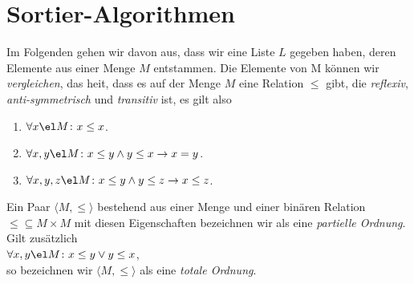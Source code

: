 \chapter{Sortier-Algorithmen}
Im Folgenden gehen wir davon aus, dass wir eine Liste $L$ gegeben haben, deren Elemente
aus einer Menge $M$ entstammen.  
Die Elemente von M k\"onnen wir \emph{vergleichen}, das
hei\3t, dass es auf der Menge $M$  eine Relation
$\leq$ gibt, die \emph{reflexiv}, \emph{anti-symmetrisch} und \emph{transitiv} ist, es gilt also  
\begin{enumerate}
\item $\forall x \el M \colon x \leq x$.
\item $\forall x, y \el M \colon x \leq y \wedge y \leq x \rightarrow x = y$.
\item $\forall x, y, z \el M \colon x \leq y \wedge y \leq z \rightarrow x \leq z$. 
\end{enumerate}
Ein Paar $\langle M, \leq \rangle$ bestehend aus einer Menge und einer bin\"aren Relation
$\leq \subseteq M \times M$ mit diesen Eigenschaften bezeichnen wir als eine
\emph{partielle Ordnung}.  Gilt zus\"atzlich \\[0.1cm]
\hspace*{1.3cm} $\forall x, y \el M \colon x \leq y \vee y \leq x$, \\[0.1cm]
so bezeichnen wir $\langle M, \leq \rangle$ als eine \emph{totale Ordnung}.
\vspace*{0.3cm}

